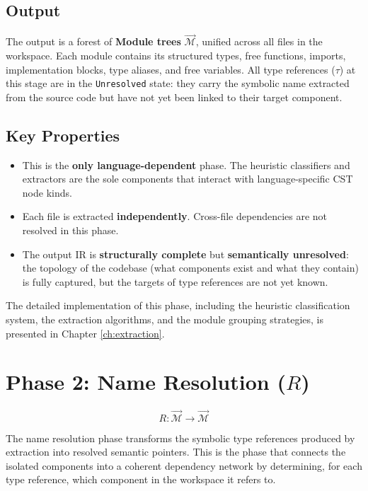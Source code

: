 \subsection{Output}

The output is a forest of \textbf{Module trees} $\vec{\mathcal{M}}$,
unified across all files in the workspace. Each module contains its
structured types, free functions, imports, implementation blocks,
type aliases, and free variables. All type references ($\tau$) at
this stage are in the \texttt{Unresolved} state: they carry the
symbolic name extracted from the source code but have not yet been
linked to their target component.

\subsection{Key Properties}
\begin{itemize}
  \item This is the \textbf{only language-dependent} phase. The
    heuristic classifiers and extractors are the sole components that
    interact with language-specific CST node kinds.
  \item Each file is extracted \textbf{independently}. Cross-file
    dependencies are not resolved in this phase.
  \item The output IR is \textbf{structurally complete} but
    \textbf{semantically unresolved}: the topology of the codebase
    (what components exist and what they contain) is fully captured,
    but the targets of type references are not yet known.
\end{itemize}

The detailed implementation of this phase, including the heuristic
classification system, the extraction algorithms, and the module
grouping strategies, is presented in Chapter \ref{ch:extraction}.

\section{Phase 2: Name Resolution ($R$)}
\label{sec:phase2_overview}

$$R : \vec{\mathcal{M}} \to \vec{\mathcal{M}}$$

The name resolution phase transforms the symbolic type references
produced by extraction into resolved semantic pointers. This is the
phase that connects the isolated components into a coherent
dependency network by determining, for each type reference, which
component in the workspace it refers to.

